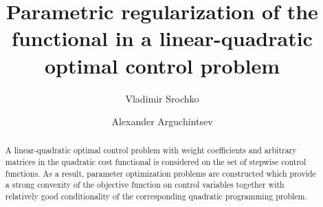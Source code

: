 \begin{englishtitle} %
\title{Parametric regularization of the functional in a linear-quadratic optimal control problem}
\author{Vladimir Srochko
  \and
  Alexander Arguchintsev
}


\maketitle

\begin{abstract}
A linear-quadratic optimal control problem with weight coefficients and arbitrary matrices in the quadratic cost functional is considered on the set of stepwise control functions. As a result, parameter optimization problems are constructed which provide a strong convexity of the objective function on control variables together with relatively good conditionality of the corresponding quadratic programming problem.

\end{abstract}
\end{englishtitle}



\iffalse
\documentclass[12pt]{llncs} 
\usepackage{iftex}

\ifPDFTeX
\usepackage[T2A]{fontenc}
\usepackage[utf8]{inputenc} %
\usepackage[english,russian]{babel}
\fi




